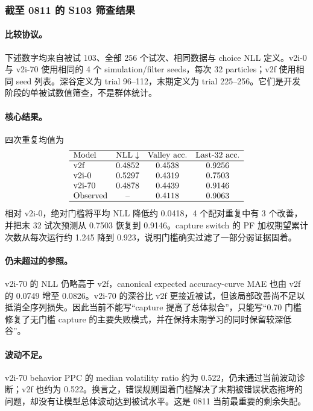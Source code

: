 \subsubsection{截至 0811 的 S103 筛查结果}

\paragraph{比较协议。}
下述数字均来自被试 103、全部 256 个试次、相同数据与 choice NLL 定义。v2i-0 与 v2i-70 使用相同的 4 个 simulation/filter seeds，每次 32 particles；v2f 使用相同 seed 列表。深谷定义为 trial 96--112，末期定义为 trial 225--256。它们是开发阶段的单被试数值筛查，不是群体统计。

\paragraph{核心结果。}
四次重复均值为
\begin{equation}
\begin{array}{lccc}
\hline
\text{Model}
&\text{NLL}\downarrow
&\text{Valley acc.}
&\text{Last-32 acc.}
\\
\hline
\text{v2f}
&0.4852&0.4538&0.9256
\\
\text{v2i-0}
&0.5297&0.4319&0.7503
\\
\text{v2i-70}
&0.4878&0.4439&0.9146
\\
\text{Observed}
&\text{--}&0.4118&0.9063
\\
\hline
\end{array}
\label{eq:model0811-s103-summary}
\end{equation}
相对 v2i-0，绝对门槛将平均 NLL 降低约 0.0418，4 个配对重复中有 3 个改善，并把末 32 试次预测从 0.7503 恢复到 0.9146。capture switch 的 PF 加权期望累计次数从每次运行约 1.245 降到 0.923，说明门槛确实过滤了一部分弱证据固着。

\paragraph{仍未超过的参照。}
v2i-70 的 NLL 仍略高于 v2f，canonical expected accuracy-curve MAE 也由 v2f 的 0.0749 增至 0.0826。v2i-70 的深谷比 v2f 更接近被试，但该局部改善尚不足以抵消全序列损失。因此当前不能写“capture 提高了总体拟合”，只能写“0.70 门槛修复了无门槛 capture 的主要失败模式，并在保持末期学习的同时保留较深低谷”。

\paragraph{波动不足。}
v2i-70 behavior PPC 的 median volatility ratio 约为 0.522，仍未通过当前波动诊断；v2f 也约为 0.522。换言之，错误规则固着门槛解决了末期被错误状态拖垮的问题，却没有让模型总体波动达到被试水平。这是 0811 当前最重要的剩余失配。


